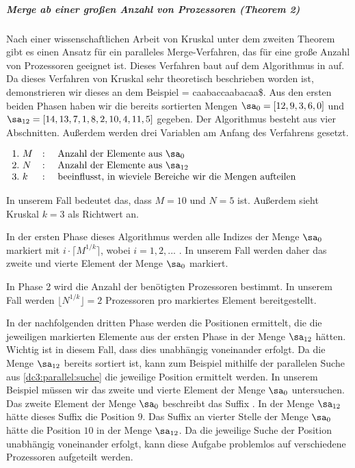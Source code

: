 \subparagraph*{Merge ab einer großen Anzahl von Prozessoren (Theorem 2)}
\label{dc3:parallel:theorem2}
Nach einer wissenschaftlichen Arbeit von Kruskal \cite[p.~943,944]{merge:kruskal} unter dem zweiten Theorem gibt es einen Ansatz für ein paralleles Merge-Verfahren, das für eine große Anzahl von Prozessoren geeignet ist. Dieses Verfahren baut auf dem Algorithmus in \cite{merge:valiant} auf.
Da dieses Verfahren von Kruskal sehr theoretisch beschrieben worden ist, demonstrieren wir dieses an dem Beispiel  = caabaccaabacaa\$. Aus den ersten beiden Phasen haben wir die bereits sortierten Mengen $\sa_{0} = [12, 9, 3, 6, 0]$ und $\sa_{12} = [14, 13, 7, 1, 8, 2, 10, 4, 11, 5]$ gegeben.
Der Algorithmus besteht aus vier Abschnitten. Außerdem werden drei Variablen am Anfang des Verfahrens gesetzt.

$\begin{array}{lcl}
1. \text{  } M & : & \text{ Anzahl der Elemente aus } \sa_0 \\
2. \text{  } N	& : & \text{ Anzahl der Elemente aus } \sa_{12} \\
3. \text{  } k & : & \text{ beeinflusst, in wieviele Bereiche wir die Mengen aufteilen}
\end{array}$

In unserem Fall bedeutet das, dass $M = 10$ und $N = 5$ ist. Außerdem sieht Kruskal $k = 3$ als Richtwert an.

In der ersten Phase dieses Algorithmus werden alle Indizes der Menge $\sa_0$ markiert mit $i \cdot \lceil M^{1/k} \rceil$, wobei $i = 1, 2, ...$ . In unserem Fall werden daher das zweite und vierte Element der Menge $\sa_0$ markiert.

In Phase 2 wird die Anzahl der benötigten Prozessoren bestimmt. In unserem Fall werden $\lfloor N^{1/k} \rfloor = 2$ Prozessoren pro markiertes Element bereitgestellt.

In der nachfolgenden dritten Phase werden die Positionen ermittelt, die die jeweiligen markierten Elemente aus der ersten Phase in der Menge $\sa_{12}$ hätten. Wichtig ist in diesem Fall, dass dies unabhängig voneinander erfolgt. Da die Menge $\sa_{12}$ bereits sortiert ist, kann zum Beispiel mithilfe der parallelen Suche aus \cref{dc3:parallel:suche} die jeweilige Position ermittelt werden. In unserem Beispiel müssen wir das zweite und vierte Element der Menge $\sa_0$ untersuchen. Das zweite Element der Menge $\sa_0$ beschreibt das Suffix . In der Menge $\sa_{12}$ hätte dieses Suffix die Position $9$. Das Suffix  an vierter Stelle der Menge $\sa_0$ hätte die Position $10$ in der Menge $\sa_{12}$.
Da die jeweilige Suche der Position unabhängig voneinander erfolgt, kann diese Aufgabe problemlos auf verschiedene Prozessoren aufgeteilt werden.


